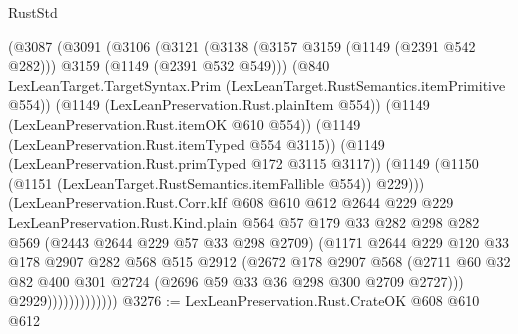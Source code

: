 \begin{lexlean}{RustStd}
\begin{coremodule}
{\begin{coremodule}
{{{{{{{{{{                    (@3087
                      (@3091
                        (@3106
                          (@3121
                            (@3138
                              (@3157 @3159 (@1149 (@2391 @542 @282)))
                              @3159
                              (@1149 (@2391 @532 @549)))
                            (@840
                              LexLeanTarget.TargetSyntax.Prim
                              (LexLeanTarget.RustSemantics.itemPrimitive @554))
                            (@1149 (LexLeanPreservation.Rust.plainItem @554))
                            (@1149 (LexLeanPreservation.Rust.itemOK @610 @554))
                            (@1149 (LexLeanPreservation.Rust.itemTyped @554 @3115))
                            (@1149 (LexLeanPreservation.Rust.primTyped @172 @3115 @3117))
                            (@1149
                              (@1150 (@1151 (LexLeanTarget.RustSemantics.itemFallible @554)) @229)))
                          (LexLeanPreservation.Rust.Corr.kIf
                            @608
                            @610
                            @612
                            @2644
                            @229
                            @229
                            LexLeanPreservation.Rust.Kind.plain
                            @564
                            @57
                            @179
                            @33
                            @282
                            @298
                            @282
                            @569
                            (@2443 @2644 @229 @57 @33 @298 @2709)
                            (@1171
                              @2644
                              @229
                              @120
                              @33
                              @178
                              @2907
                              @282
                              @568
                              @515
                              @2912
                              (@2672
                                @178
                                @2907
                                @568
                                (@2711
                                  @60
                                  @32
                                  @82
                                  @400
                                  @301
                                  @2724
                                  (@2696 @59 @33 @36 @298 @300 @2709 @2727)))
                              @2929)))))))))))))
@3276 := LexLeanPreservation.Rust.CrateOK @608 @610 @612
}}}}}}}}}}
\end{coremodule}}
\end{coremodule}
\end{lexlean}
